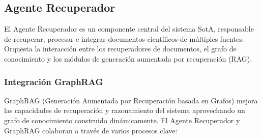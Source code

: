 \documentclass[12pt]{article}
\begin{document}
\subsection{Agente Recuperador}
El Agente Recuperador es un componente central del sistema SotA, responsable de recuperar, procesar e integrar documentos científicos de múltiples fuentes. Orquesta la interacción entre los recuperadores de documentos, el grafo de conocimiento y los módulos de generación aumentada por recuperación (RAG).

\subsubsection{Integración GraphRAG}
GraphRAG (Generación Aumentada por Recuperación basada en Grafos) mejora las capacidades de recuperación y razonamiento del sistema aprovechando un grafo de conocimiento construido dinámicamente. El Agente Recuperador y GraphRAG colaboran a través de varios procesos clave:
\end{document}
